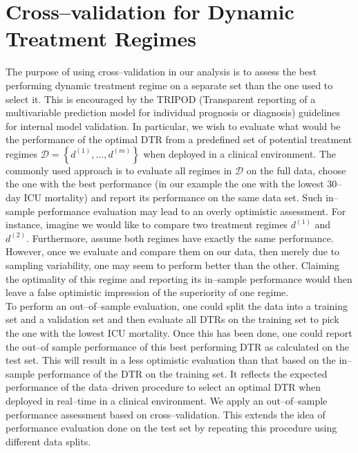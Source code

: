 \documentclass[12pt]{article}
\begin{document}
\section{Cross--validation for Dynamic Treatment Regimes}\label{sec3}

The purpose of using cross--validation in our analysis is to assess the best performing dynamic treatment regime on a separate set than the one used to select it. This is encouraged by the TRIPOD (Transparent reporting of a multivariable prediction model for individual prognosis or diagnosis) \citep{Collins2015} guidelines for internal model validation. In particular, we wish to evaluate what would be the performance of the optimal DTR from a predefined set of potential treatment regimes $\mathcal{D} = \left\lbrace d^{(1)}, \dots, d^{(m)} \right\rbrace$ when deployed in a clinical environment. The commonly used approach is to evaluate all regimes in $\mathcal{D}$ on the full data, choose the one with the best performance (in our example the one with the lowest $30$--day ICU mortality) and report its performance on the same data set.  Such in--sample performance evaluation may lead to an overly optimistic assessment. For instance, imagine we would like to compare two treatment regimes $d^{(1)}$ and $d^{(2)}$. Furthermore, assume both regimes have exactly the same performance. However, once we evaluate and compare them on our data, then merely due to sampling variability, one may seem to perform better than the other. Claiming the optimality of this regime and reporting its in--sample performance would then leave a false optimistic impression of the superiority of one regime.
\\
\indent
To perform an out--of--sample evaluation, one could split the data into a training set and a validation set and then evaluate all DTRs on the training set to pick the one with the lowest ICU mortality.  Once this has been done, one could report the out--of sample performance of this best performing DTR as calculated on the test set. This will result in a less optimistic evaluation than that based on the in--sample performance of the DTR on the training set. It reflects the expected performance of the data--driven procedure to select an optimal DTR when deployed in real--time in a clinical environment.  We apply an out--of--sample performance assessment based on cross--validation. This extends the idea of performance evaluation done on the test set by repeating this procedure using different data splits. 
\\
\indent
\end{document}
